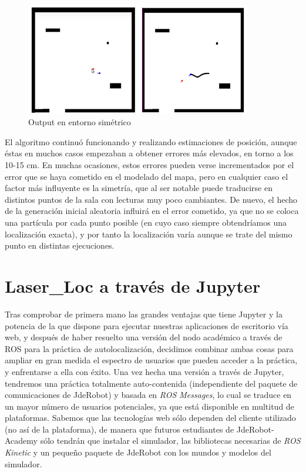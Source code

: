 \begin{figure}[H]
	\begin{center}
		\includegraphics[width=0.88\textwidth]{figures/outputsimetrico.png}
		\caption{Output en entorno simétrico}
		\label{fig.outputsimetrico}
		\end{center}
\end{figure}

El algoritmo continuó funcionando y realizando estimaciones de posición, aunque éstas en muchos casos empezaban a obtener errores más elevados, en torno a los 10-15 cm. En muchas ocasiones, estos errores pueden verse incrementados por el error que se haya cometido en el modelado del mapa, pero en cualquier caso el factor más influyente es la simetría, que al ser notable puede traducirse en distintos puntos de la sala con lecturas muy poco cambiantes. De nuevo, el hecho de la generación inicial aleatoria influirá en el error cometido, ya que no se coloca una partícula por cada punto posible (en cuyo caso siempre obtendríamos una localización exacta), y por tanto la localización varía aunque se trate del mismo punto en distintas ejecuciones.

\section{Laser\_Loc a través de Jupyter}
Tras comprobar de primera mano las grandes ventajas que tiene Jupyter y la potencia de la que dispone para ejecutar nuestras aplicaciones de escritorio vía web, y después de haber resuelto una versión del nodo académico a través de ROS para la práctica de autolocalización, decidimos combinar ambas cosas para ampliar en gran medida el espectro de usuarios que pueden acceder a la práctica, y enfrentarse a ella con éxito. Una vez hecha una versión a través de Jupyter, tendremos una práctica totalmente auto-contenida (independiente del paquete de comunicaciones de JdeRobot) y basada en \textit{ROS Messages}, lo cual se traduce en un mayor número de usuarios potenciales, ya que está disponible en multitud de plataformas. Sabemos que las tecnologías web sólo dependen del cliente utilizado (no así de la plataforma), de manera que futuros estudiantes de JdeRobot-Academy sólo tendrán que instalar el simulador, las bibliotecas necesarias de \textit{ROS Kinetic} y un pequeño paquete de JdeRobot con los mundos y modelos del simulador.

